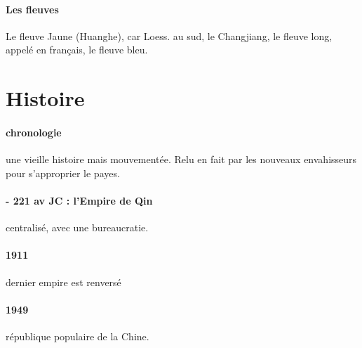  

\paragraph{Les fleuves} Le fleuve Jaune (Huanghe), car Loess. au sud, le Changjiang, le fleuve long, appelé en français, le fleuve bleu.


\section{Histoire}
\paragraph{chronologie} une vieille histoire mais mouvementée. Relu en fait par les nouveaux envahisseurs pour s'approprier le payes. 

\paragraph{- 221 av JC : l'Empire de Qin} centralisé, avec une bureaucratie.

\paragraph{1911} dernier empire est renversé
\paragraph{1949} république populaire de la Chine.

